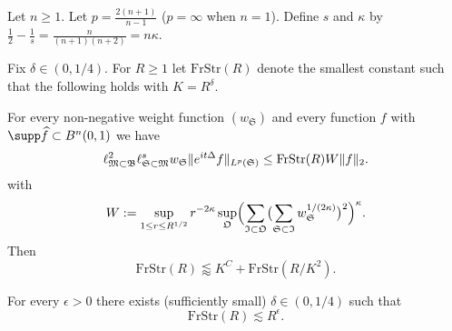 \documentclass[biblatex]{pzorin-note}
\newcommand{\eit}{e^{i t \Delta}}
\newcommand{\FrStr}{\mathrm{FrStr}}
\newcommand{\bB}{\mathfrak{B}} %
\newcommand{\bM}{\mathfrak{M}} %
\newcommand{\bS}{\mathfrak{S}} %
\newcommand{\bO}{\mathfrak{O}} %
\newcommand{\bI}{\mathfrak{I}} %
\begin{document}
\begin{proposition} \label{prop:fractal-strichartz}
Let $n\geq 1$.
Let $p=\frac{2(n+1)}{n-1}$ ($p=\infty$ when $n=1$).
Define $s$ and $\kappa$ by $\frac{1}{2} - \frac{1}{s} = \frac{n}{(n+1)(n+2)} = n \kappa$.

Fix $\delta \in (0,1/4)$.
For $R\geq 1$ let $\FrStr(R)$ denote the smallest constant such that the following holds with $K=R^{\delta}$.

For every non-negative weight function $(w_{\bS})$ and every function $f$ with $\supp \widehat{f}\subset B^n(0,1)$ we have
\begin{equation}\label{eq-main}
\ell^{2}_{\bM \subset \bB} \ell^{s}_{\bS \subset \bM} w_{\bS} \norm{ \eit f }_{L^{p}(\bS)}
\leq
\FrStr(R) W \norm{f}_2.
\end{equation}
with
\[
W := \sup_{1 \leq r \leq R^{1/2}} r^{-2\kappa} \sup_{\bO} \Bigl( \sum_{\bI \subset \bO} \bigl( \sum_{\bS \subset \bI} w_{\bS}^{1/(2\kappa)} \bigr)^{2}  \Bigr)^{\kappa}.
\]
Then
\[
\FrStr(R) \lessapprox K^{C} + \FrStr(R/K^{2}).
\]
\end{proposition}
\begin{corollary} \label{cor:fractal-strichartz}
For every $\epsilon>0$ there exists (sufficiently small) $\delta \in (0,1/4)$ such that
\[
\FrStr(R) \lesssim R^{\epsilon}.
\]
\end{corollary}
\end{document}
